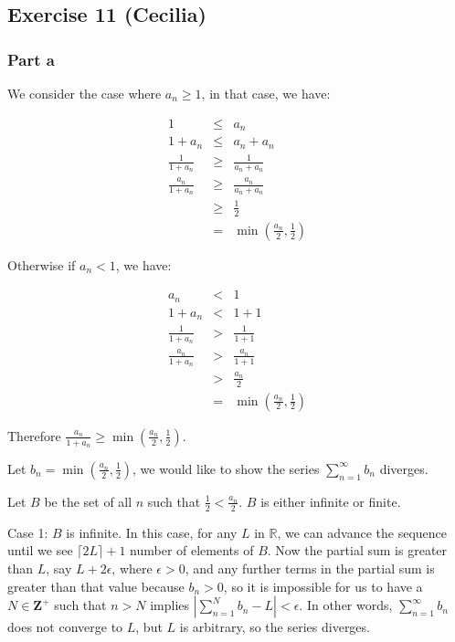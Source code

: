\subsection*{Exercise 11 (Cecilia)}

\subsubsection*{Part a}
We consider the case where $ a_n \ge 1 $, in that case, we have:

\begin{eqnarray*}
                    1 &\le& a_n \\
              1 + a_n &\le& a_n + a_n \\
    \frac{1}{1 + a_n} &\ge& \frac{1}{a_n + a_n} \\
  \frac{a_n}{1 + a_n} &\ge& \frac{a_n}{a_n + a_n} \\
                      &\ge& \frac{1}{2} \\
                      & = & \min(\frac{a_n}{2}, \frac{1}{2})
\end{eqnarray*}

Otherwise if $ a_n < 1 $, we have:

\begin{eqnarray*}
                  a_n & < & 1 \\
              1 + a_n & < & 1 + 1 \\
    \frac{1}{1 + a_n} & > & \frac{1}{1 + 1} \\  
  \frac{a_n}{1 + a_n} & > & \frac{a_n}{1 + 1} \\
                      & > & \frac{a_n}{2} \\
                      & = & \min(\frac{a_n}{2}, \frac{1}{2})
\end{eqnarray*}

Therefore $ \frac{a_n}{1 + a_n} \ge \min(\frac{a_n}{2}, \frac{1}{2}) $.

Let $ b_n = \min(\frac{a_n}{2}, \frac{1}{2}) $, we would like to show the series $ \sum\limits_{n=1}^{\infty} b_n $ diverges.

Let $ B $ be the set of all $ n $ such that $ \frac{1}{2} < \frac{a_n}{2} $. $ B $ is either infinite or finite.

Case 1: $ B $ is infinite. In this case, for any $ L $ in $ \mathbb{R} $, we can advance the sequence until we see $ \lceil 2L \rceil + 1 $ number of elements of $ B $. Now the partial sum is greater than $ L $, say $ L + 2\epsilon $, where $ \epsilon > 0 $, and any further terms in the partial sum is greater than that value because $ b_n > 0 $, so it is impossible for us to have a $ N \in \mathbf{Z^+} $ such that $ n > N $ implies $ |\sum\limits_{n=1}^{N} b_n - L| < \epsilon $. In other words, $ \sum\limits_{n=1}^{\infty} b_n $ does not converge to $ L $, but $ L $ is arbitrary, so the series diverges.

